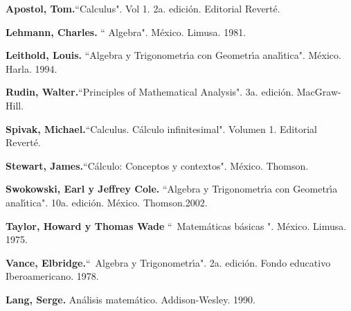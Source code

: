 

\begin{thebibliography}{9999999999}                                                                                       %
\textbf{Apostol, Tom.}\textquotedblleft Calculus". Vol
1. 2a. edici\'{o}n. Editorial Revert\'{e}.

\textbf{Lehmann, Charles.} \textquotedblleft
Algebra". M\'{e}xico. Limusa. 1981.

\textbf{Leithold, Louis.} \textquotedblleft Algebra y
Trigonometr\'{\i}a con Geometr\'{\i}a anal\'{\i}tica". M\'{e}xico. Harla. 1994.

\textbf{Rudin, Walter.}\textquotedblleft Principles
of Mathematical Analysis". 3a. edici\'{o}n. MacGraw-Hill.

\textbf{Spivak, Michael.}\textquotedblleft Calculus.
C\'{a}lculo infinitesimal". Volumen 1. Editorial Revert\'{e}.

\textbf{Stewart, James.}\textquotedblleft C\'{a}lculo:
Conceptos y contextos". M\'{e}xico. Thomson.

\textbf{Swokowski, Earl y Jeffrey Cole.}
\textquotedblleft Algebra y Trigonometr\'{\i}a con Geometr\'{\i}a
anal\'{\i}tica". 10a. edici\'{o}n. M\'{e}xico. Thomson.2002.

\textbf{Taylor, Howard y Thomas Wade}
\textquotedblleft\ Matem\'{a}ticas b\'{a}sicas ". M\'{e}xico. Limusa. 1975.

\textbf{Vance, Elbridge.}\textquotedblleft\ Algebra
y Trigonometr\'{\i}a". 2a. edici\'{o}n. Fondo educativo Iberoamericano. 1978.

\textbf{Lang, Serge. }An\'{a}lisis matem\'{a}tico.
Addison-Wesley. 1990.
\end{thebibliography}

